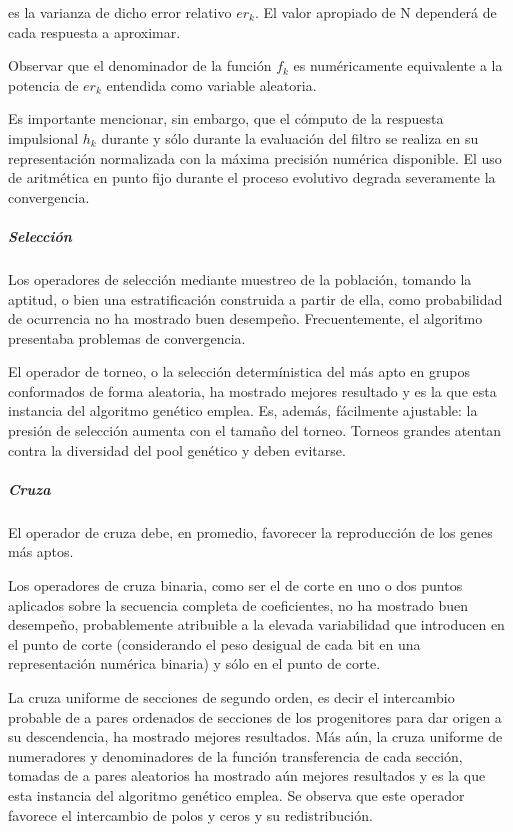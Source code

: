 \documentclass[11pt]{article}
\begin{document}
es la varianza de dicho error relativo \(er_k\). El valor apropiado de N
dependerá de cada respuesta a aproximar.

Observar que el denominador de la función \(f_k\) es numéricamente
equivalente a la potencia de \(er_k\) entendida como variable aleatoria.

Es importante mencionar, sin embargo, que el cómputo de la respuesta
impulsional \(h_k\) durante y sólo durante la evaluación del filtro se
realiza en su representación normalizada con la máxima precisión
numérica disponible. El uso de aritmética en punto fijo durante el
proceso evolutivo degrada severamente la convergencia.

\subparagraph{Selección}\label{selecciuxf3n}

Los operadores de selección mediante muestreo de la población, tomando
la aptitud, o bien una estratificación construida a partir de ella, como
probabilidad de ocurrencia no ha mostrado buen desempeño.
Frecuentemente, el algoritmo presentaba problemas de convergencia.

El operador de torneo, o la selección determínistica del más apto en
grupos conformados de forma aleatoria, ha mostrado mejores resultado y
es la que esta instancia del algoritmo genético emplea. Es, además,
fácilmente ajustable: la presión de selección aumenta con el tamaño del
torneo. Torneos grandes atentan contra la diversidad del pool genético y
deben evitarse.

\subparagraph{Cruza}\label{cruza}

El operador de cruza debe, en promedio, favorecer la reproducción de los
genes más aptos.

Los operadores de cruza binaria, como ser el de corte en uno o dos
puntos aplicados sobre la secuencia completa de coeficientes, no ha
mostrado buen desempeño, probablemente atribuible a la elevada
variabilidad que introducen en el punto de corte (considerando el peso
desigual de cada bit en una representación numérica binaria) y sólo en
el punto de corte.

La cruza uniforme de secciones de segundo orden, es decir el intercambio
probable de a pares ordenados de secciones de los progenitores para dar
origen a su descendencia, ha mostrado mejores resultados. Más aún, la
cruza uniforme de numeradores y denominadores de la función
transferencia de cada sección, tomadas de a pares aleatorios ha mostrado
aún mejores resultados y es la que esta instancia del algoritmo genético
emplea. Se observa que este operador favorece el intercambio de polos y
ceros y su redistribución.
\end{document}
